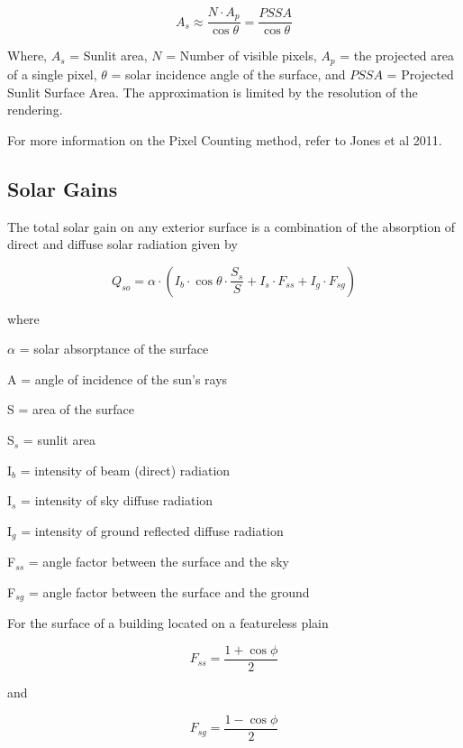 \begin{equation}
A_s \approx \frac{N \cdot A_p}{\cos{\theta}} = \frac{PSSA}{\cos{\theta}}
\end{equation}

Where, $A_s$ = Sunlit area, $N$ = Number of visible pixels, $A_p$ = the projected area of a single pixel, $\theta$ = solar incidence angle of the surface, and $PSSA$ = Projected Sunlit Surface Area. The approximation is limited by the resolution of the rendering.

For more information on the Pixel Counting method, refer to Jones et al 2011.

\subsection{Solar Gains}\label{solar-gains-000}

The total solar gain on any exterior surface is a combination of the absorption of direct and diffuse solar radiation given by

\begin{equation}
{Q_{so}} = \alpha \cdot \left( {{I_b}\cdot \cos \theta \cdot \frac{{{S_s}}}{S} + {I_s}\cdot {F_{ss}} + {I_g}\cdot {F_{sg}}} \right)
\end{equation}

where

$\alpha$ = solar absorptance of the surface

A = angle of incidence of the sun's rays

S = area of the surface

S\(_{s}\) = sunlit area

I\(_{b}\) = intensity of beam (direct) radiation

I\(_{s}\) = intensity of sky diffuse radiation

I\(_{g}\) = intensity of ground reflected diffuse radiation

F\(_{ss}\) = angle factor between the surface and the sky

F\(_{sg}\) = angle factor between the surface and the ground

For the surface of a building located on a featureless plain

\begin{equation}
{F_{ss}} = \frac{{1 + \cos \phi }}{2}
\end{equation}

and

\begin{equation}
{F_{sg}} = \frac{{1 - \cos \phi }}{2}
\end{equation}

